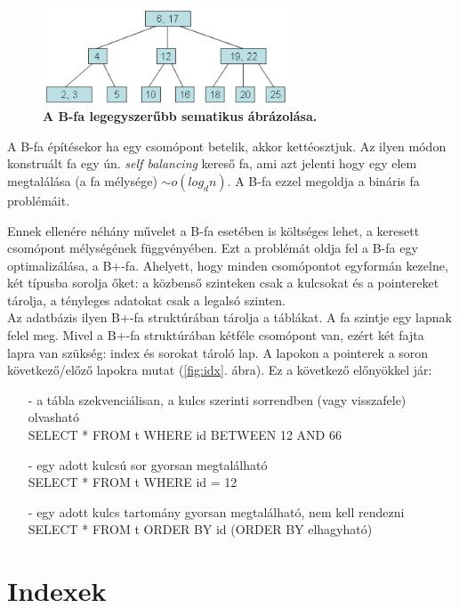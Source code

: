 \documentclass[12pt]{article}
\theoremstyle{plain}
\begin{document}
\begin{figure}[H]
    \begin{center}
    \includegraphics[width=0.65\textwidth]{media/btree.png}
    \caption{\textbf{A B-fa legegyszerűbb sematikus ábrázolása.}} 
    \label{fig:tree}
    \end{center}
\end{figure}

A B-fa építésekor ha egy csomópont betelik, akkor kettéosztjuk. Az ilyen módon konstruált fa egy ún. \textit{self balancing} kereső fa, ami azt jelenti hogy egy elem megtalálása (a fa mélysége) $\sim o(log_dn)$. A B-fa ezzel megoldja a bináris fa problémáit.
\par
Ennek ellenére néhány művelet a B-fa esetében is költséges lehet, a keresett csomópont mélységének függvényében. Ezt a problémát oldja fel a B-fa egy optimalizálása, a B+-fa. Ahelyett, hogy minden csomópontot egyformán kezelne, két típusba sorolja őket: a közbenső szinteken csak a kulcsokat és a pointereket tárolja, a tényleges adatokat csak a legalsó szinten. 
\\
Az adatbázis ilyen B+-fa struktúrában tárolja a táblákat. A fa szintje egy lapnak felel meg. Mivel a B+-fa struktúrában kétféle csomópont van, ezért két fajta lapra van szükség: index és sorokat tároló lap. A lapokon a pointerek a soron következő/előző lapokra mutat (\ref{fig:idx}. ábra). Ez a következő előnyökkel jár: 
\begin{itemize}
    \item[-] a tábla szekvenciálisan, a kulcs szerinti sorrendben (vagy visszafele) olvasható \\
    SELECT * FROM t WHERE id BETWEEN 12 AND 66
    \item[-] egy adott kulcsú sor gyorsan megtalálható \\SELECT * FROM t WHERE id = 12
    \item[-] egy adott kulcs tartomány gyorsan megtalálható, nem kell rendezni \\
    SELECT * FROM t ORDER BY id (ORDER BY elhagyható)
\end{itemize}{}

\section{Indexek}
\end{document}
